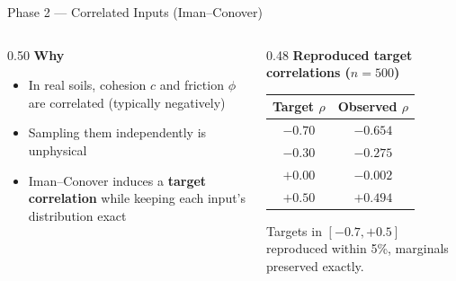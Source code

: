 \documentclass[aspectratio=169]{beamer}
\begin{document}
\begin{frame}{Phase 2 --- Correlated Inputs (Iman--Conover)}
    \begin{columns}[t]
        \begin{column}{0.50\textwidth}
            \textbf{Why}
            \begin{itemize}
                \setlength\itemsep{0.3em}
                \item In real soils, cohesion $c$ and friction $\phi$ are correlated (typically negatively)
                \item Sampling them independently is unphysical
                \item Iman--Conover induces a \textbf{target correlation} while keeping each input's distribution exact
            \end{itemize}
        \end{column}
        \begin{column}{0.48\textwidth}
            \textbf{Reproduced target correlations ($n{=}500$)}
            \begin{center}
            \small
            \begin{tabular}{cc}
                \toprule
                Target $\rho$ & Observed $\rho$ \\
                \midrule
                $-0.70$ & $-0.654$ \\
                $-0.30$ & $-0.275$ \\
                $+0.00$ & $-0.002$ \\
                $+0.50$ & $+0.494$ \\
                \bottomrule
            \end{tabular}
            \end{center}
            \vspace{0.2cm}
            {\small Targets in $[-0.7,+0.5]$ reproduced within 5\%, marginals preserved exactly.}
        \end{column}
    \end{columns}
\end{frame}
\end{document}
